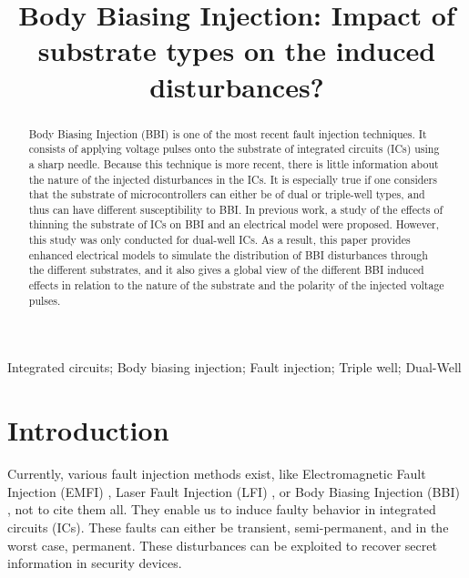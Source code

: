 \documentclass[10pt, conference, compsocconf]{IEEEtran}
\begin{document}
\title{Body Biasing Injection: Impact of substrate types on the induced disturbances?}
\author{

}
\maketitle

\begin{abstract}
Body Biasing Injection (BBI) is one of the most recent fault injection techniques. It consists of applying voltage pulses onto the substrate of integrated circuits (ICs) using a sharp needle. Because this technique is more recent, there is little information about the nature of the injected disturbances in the ICs. It is especially true if one considers that the substrate of microcontrollers can either be of dual or triple-well types, and thus can have different susceptibility to BBI. In previous work, a study of the effects of thinning the substrate of ICs on BBI and an electrical model were proposed. However, this study was only conducted for dual-well ICs. As a result, this paper provides enhanced electrical models to simulate the distribution of BBI disturbances through the different substrates, and it also gives a global view of the different BBI induced effects in relation to the nature of the substrate and the polarity of the injected voltage pulses.
\end{abstract}

\begin{IEEEkeywords}
Integrated circuits; Body biasing injection; Fault injection; Triple well; Dual-Well
\end{IEEEkeywords}
\IEEEpeerreviewmaketitle
\section{Introduction}
Currently, various fault injection methods exist, like Electromagnetic Fault Injection (EMFI) \cite{mathieuEMFI, techEM}, Laser Fault Injection (LFI) \cite{optical, phototriple}, or Body Biasing Injection (BBI) \cite{pmaurine2012, ktobich2013, nbb2016, oflynn2020, japBBI, mybbi}, not to cite them all. They enable us to induce faulty behavior in integrated circuits (ICs). These faults can either be transient, semi-permanent, and in the worst case, permanent. These disturbances can be exploited to recover secret information in security devices.
\end{document}
